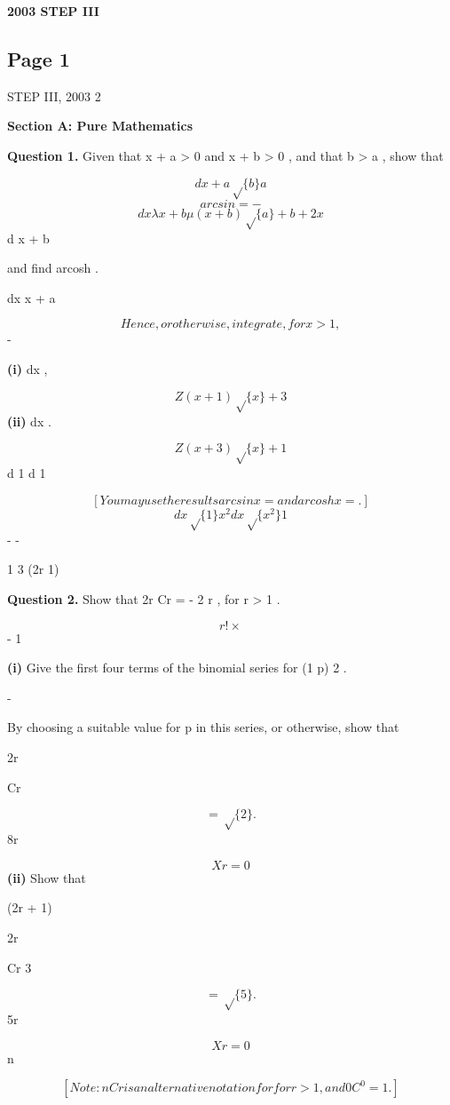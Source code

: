 \documentclass[12pt]{article}
\begin{document}
\begin{center}
{\Large \textbf{2003 STEP III}}
\end{center}

\subsection*{Page 1}
\begin{flushleft}
STEP III, 2003 2\par
\bigskip\textbf{Section A: Pure Mathematics}\par
\bigskip\textbf{Question 1.} Given that x + a > 0 and x + b > 0 , and that b > a , show that\par
\[d x + a \sqrt\{b\} a\]
\[arcsin = -\]
\[dx \lambda x + b \mu (x + b) \sqrt\{a\} + b + 2x\]
d x + b\par
and find arcosh .\par
dx \lambda x + a \mu\par
\[Hence, or otherwise, integrate, for x > 1 ,\]
-\par
\textbf{(i)} dx ,\par
\[Z (x + 1) \sqrt\{x\} + 3\]
\textbf{(ii)} dx .\par
\[Z (x + 3) \sqrt\{x\} + 1\]
d 1 d 1\par
\[[You may use the results arcsin x = and arcosh x = . ]\]
\[dx \sqrt\{1\} x^2 dx \sqrt\{x^2\} 1\]
- -\par
1 3 (2r 1)\par
\bigskip\textbf{Question 2.} Show that 2r Cr = \times \times \cdots \times - 2 r , for r > 1 .\par
\[r! \times\]
- 1\par
\textbf{(i)} Give the first four terms of the binomial series for (1 p) 2 .\par
-\par
By choosing a suitable value for p in this series, or otherwise, show that\par
\infty 2r\par
Cr\par
\[= \sqrt\{2\} .\]
8r\par
\[Xr=0\]
\textbf{(ii)} Show that\par
\infty\par
(2r + 1)\par
2r\par
Cr 3\par
\[= \sqrt\{5\} .\]
5r\par
\[Xr=0\]
n\par
\[[Note: n Cr is an alternative notation for for r > 1 , and 0 C^0 = 1 .]\]
\lambdar\mu\par
\end{flushleft}
\end{document}
